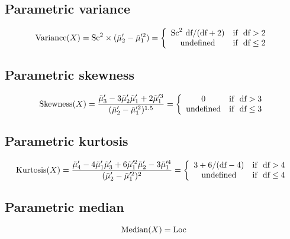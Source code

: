 \documentclass{article}
\begin{document}
\subsection{Parametric variance}
\begin{equation*} \mathrm{Variance}(X)=\text{Sc}^{2}\times (\tilde{\mu}'_{2}-\tilde{\mu}'^{2}_{1})=\left\{\begin{array}{cl} \text{Sc}^{2} \ \text{df}/(\text{df}+2) & \text{if } \ \text{df} > 2 \\ \text{undefined} & \text{if } \  \text{df} \leq 2 \end{array} \right.\\ \end{equation*}
\subsection{Parametric skewness}
\begin{equation*} \mathrm{Skewness}(X)=\frac{\tilde{\mu}'_{3}-3\tilde{\mu}'_{2}\tilde{\mu}'_{1}+2\tilde{\mu}'^{3}_{1}}{(\tilde{\mu}'_{2}-\tilde{\mu}'^{2}_{1})^{1.5}}=\left\{\begin{array}{cl} 0 & \text{if } \ \text{df} > 3 \\ \text{undefined} & \text{if } \  \text{df} \leq 3 \end{array} \right.\\ \end{equation*}
\subsection{Parametric kurtosis}
\begin{equation*} \mathrm{Kurtosis}(X)=\frac{\tilde{\mu}'_{4}-4\tilde{\mu}'_{1}\tilde{\mu}'_{3}+6\tilde{\mu}'^{2}_{1}\tilde{\mu}'_{2}-3\tilde{\mu}'^{4}_{1}}{(\tilde{\mu}'_{2}-\tilde{\mu}'^{2}_{1})^{2}}=\left\{\begin{array}{cl} 3+6/(\text{df}-4) & \text{if } \ \text{df} > 4 \\ \text{undefined} & \text{if } \ \text{df} \leq 4 \end{array} \right.\\ \end{equation*}
\subsection{Parametric median}
\begin{equation*} \mathrm{Median}(X)=\text{Loc}\\ \end{equation*}
\end{document}
